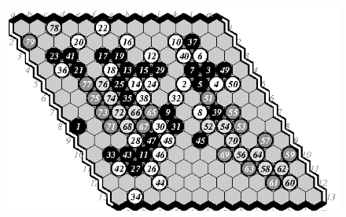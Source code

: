 \documentclass{IOS-Book-Article}
\begin{document}
\begin{figure}
\includegraphics[scale=.9]{pix/13.me3plus.eps}
\smallskip


\end{figure}
\end{document}
